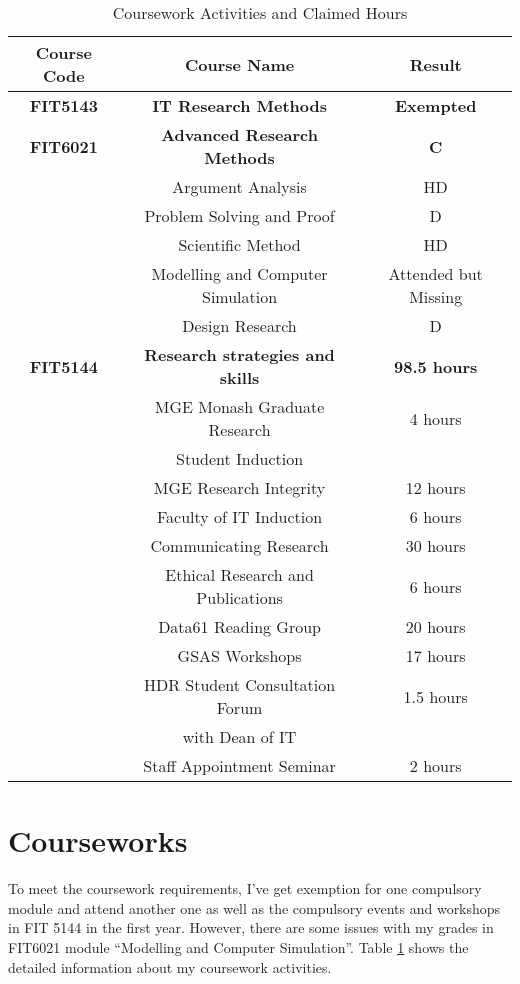 \begin{table}[h]
\centering
\begin{tabular}{|c|c|c|}
\hline
\bf Course Code & \bf Course Name & \bf Result \\ \hline
\bf FIT5143 & \bf IT Research Methods & \bf Exempted \\ \hline
\bf  FIT6021 & \bf Advanced Research Methods & \bf C \\ \hline
& Argument Analysis & HD \\ \hline
& Problem Solving and Proof & D \\ \hline
& Scientific Method & HD \\ \hline
& Modelling and Computer Simulation & Attended but Missing \\ \hline
& Design Research & D \\ \hline
\bf FIT5144 & \bf Research strategies and skills  & \bf 98.5 hours \\ \hline
& MGE Monash Graduate Research & 4 hours \\ 
& Student Induction &  \\ \hline
& MGE  Research Integrity & 12 hours \\ \hline
& Faculty of IT Induction & 6 hours \\ \hline
& Communicating Research & 30 hours\\ \hline
& Ethical Research and Publications & 6 hours\\ \hline
& Data61 Reading Group & 20 hours\\ \hline
& GSAS Workshops & 17 hours\\ \hline
& HDR Student Consultation Forum & 1.5 hours\\
& with Dean of IT & \\ \hline
& Staff Appointment Seminar & 2 hours \\ \hline
\end{tabular}
\caption{Coursework Activities and Claimed Hours}
\label{tlb:coursework}
\end{table}

\section{Courseworks}
To meet the coursework requirements, I've get exemption for one compulsory module and attend another one as well as the compulsory events and workshops in FIT 5144 in the first year. However, there are some issues with my grades in FIT6021 module ``Modelling and Computer Simulation''. Table \ref{tlb:coursework} shows the detailed information about my coursework activities. 

